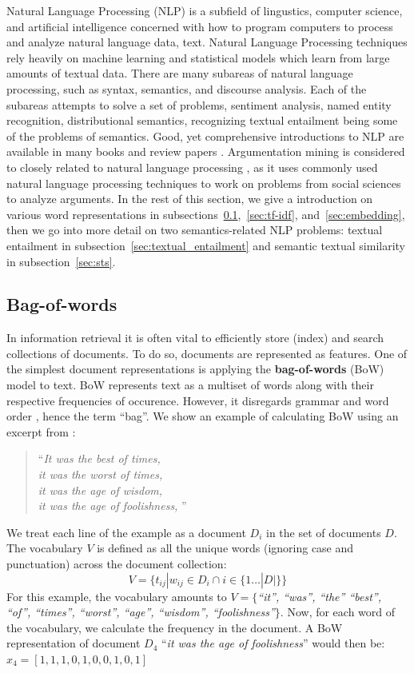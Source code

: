 Natural Language Processing (NLP) is a subfield of lingustics, computer
science, and artificial intelligence concerned with how to program computers to
process and analyze natural language data, text.  Natural Language Processing
techniques rely heavily on machine learning and statistical models which learn
from large amounts of textual data.  There are many subareas of natural
language processing, such as syntax, semantics, and discourse analysis.
Each of the subareas attempts to solve a set of problems, sentiment analysis, named
entity recognition, distributional semantics, recognizing textual entailment being
some of the problems of semantics. Good, yet comprehensive introductions to NLP are available 
in many books \citep{manning1999foundations} and review papers \citep{collobert2011natural}. 
Argumentation
mining is considered to closely related to natural language processing
\citep{lippi2015argument}, as it uses commonly used natural language processing
techniques to work on problems from social sciences to analyze arguments.
In the rest of this section, we give a introduction on various word representations
in subsections~\ref{sec:bow},~\ref{sec:tf-idf}, and~\ref{sec:embedding}, 
then we go into more detail on two 
semantics-related NLP problems: textual entailment in subsection~\ref{sec:textual_entailment}
and semantic textual similarity in subsection~\ref{sec:sts}.

\subsection{Bag-of-words}
\label{sec:bow}
In information retrieval it is often 
vital to efficiently 
store (index) and search collections of documents. 
To do so, documents are represented as features. 
One of the simplest document representations is applying the 
\textbf{bag-of-words} (BoW) model to text. BoW represents text as a multiset of
words along with their respective frequencies of occurence. However, it disregards
grammar and word order
\citep{harris1954distributional}, hence the term ``bag''. 
We show an example of calculating BoW
using an excerpt from \citep{dickens1949tale}:
\begin{quote}
``\emph{It was the best of times, \\
it was the worst of times, \\
it was the age of wisdom, \\
it was the age of foolishness,
}''
\end{quote}
We treat each line of the example as a document $D_i$ in the set of documents
$D$. The vocabulary $V$ is 
defined as all the unique words (ignoring case and punctuation)
across the document collection:
$$
V = \{t_{ij} | w_{ij} \in D_i \cap i \in \{1 \dots |D|\} \}
$$
For this example, the vocabulary amounts to
$V = \{$\emph{``it'', ``was'', ``the'' ``best'', ``of'', ``times'', ``worst'', ``age'',
``wisdom'', ``foolishness''}$\}$.
Now, for each word of the vocabulary, we calculate the frequency in the document. 
A BoW representation of document $D_4$ 
``\emph{it was the age of foolishness}''
would then be: $x_4 = [1, 1, 1, 0, 1, 0, 0, 1, 0, 1]$

